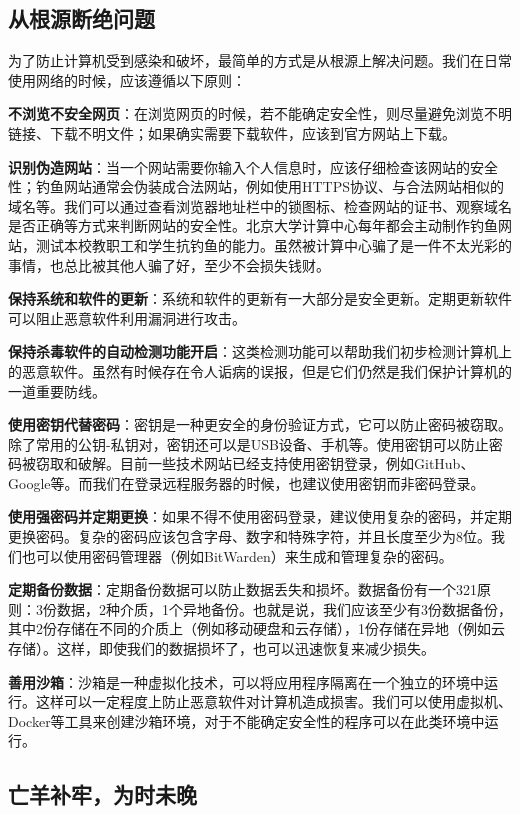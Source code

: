 \documentclass[../main.tex]{subfiles}
\begin{document}
\subsection{从根源断绝问题}

为了防止计算机受到感染和破坏，最简单的方式是从根源上解决问题。我们在日常使用网络的时候，应该遵循以下原则：

\textbf{不浏览不安全网页}：在浏览网页的时候，若不能确定安全性，则尽量避免浏览不明链接、下载不明文件；如果确实需要下载软件，应该到官方网站上下载。

\textbf{识别伪造网站}：当一个网站需要你输入个人信息时，应该仔细检查该网站的安全性；钓鱼网站通常会伪装成合法网站，例如使用HTTPS协议、与合法网站相似的域名等。我们可以通过查看浏览器地址栏中的锁图标、检查网站的证书、观察域名是否正确等方式来判断网站的安全性。北京大学计算中心每年都会主动制作钓鱼网站，测试本校教职工和学生抗钓鱼的能力。虽然被计算中心骗了是一件不太光彩的事情，也总比被其他人骗了好，至少不会损失钱财。

\textbf{保持系统和软件的更新}：系统和软件的更新有一大部分是安全更新。定期更新软件可以阻止恶意软件利用漏洞进行攻击。

\textbf{保持杀毒软件的自动检测功能开启}：这类检测功能可以帮助我们初步检测计算机上的恶意软件。虽然有时候存在令人诟病的误报，但是它们仍然是我们保护计算机的一道重要防线。

\textbf{使用密钥代替密码}：密钥是一种更安全的身份验证方式，它可以防止密码被窃取。除了常用的公钥-私钥对，密钥还可以是USB设备、手机等。使用密钥可以防止密码被窃取和破解。目前一些技术网站已经支持使用密钥登录，例如GitHub、Google等。而我们在登录远程服务器的时候，也建议使用密钥而非密码登录。

\textbf{使用强密码并定期更换}：如果不得不使用密码登录，建议使用复杂的密码，并定期更换密码。复杂的密码应该包含字母、数字和特殊字符，并且长度至少为8位。我们也可以使用密码管理器（例如BitWarden）来生成和管理复杂的密码。

\textbf{定期备份数据}：定期备份数据可以防止数据丢失和损坏。数据备份有一个321原则：3份数据，2种介质，1个异地备份。也就是说，我们应该至少有3份数据备份，其中2份存储在不同的介质上（例如移动硬盘和云存储），1份存储在异地（例如云存储）。这样，即使我们的数据损坏了，也可以迅速恢复来减少损失。

\textbf{善用沙箱}：沙箱是一种虚拟化技术，可以将应用程序隔离在一个独立的环境中运行。这样可以一定程度上防止恶意软件对计算机造成损害。我们可以使用虚拟机、Docker等工具来创建沙箱环境，对于不能确定安全性的程序可以在此类环境中运行。

\subsection{亡羊补牢，为时未晚}
\end{document}
